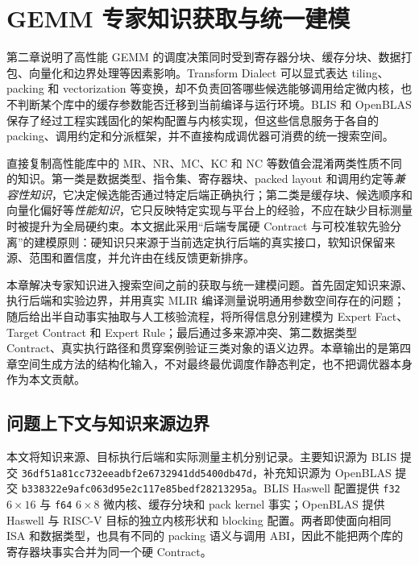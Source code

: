 
\chapter{GEMM 专家知识获取与统一建模}

第二章说明了高性能 GEMM 的调度决策同时受到寄存器分块、缓存分块、数据打包、向量化和边界处理等因素影响。Transform Dialect 可以显式表达 tiling、packing 和 vectorization 等变换，却不负责回答哪些候选能够调用给定微内核，也不判断某个库中的缓存参数能否迁移到当前编译与运行环境。BLIS 和 OpenBLAS 保存了经过工程实践固化的架构配置与内核实现，但这些信息服务于各自的 packing、调用约定和分派框架，并不直接构成调优器可消费的统一搜索空间\cite{VanZee2015BLIS,OpenMathLibOpenBLAS,LLVMProjectTransformDialect}。

直接复制高性能库中的 MR、NR、MC、KC 和 NC 等数值会混淆两类性质不同的知识。第一类是数据类型、指令集、寄存器块、packed layout 和调用约定等\emph{兼容性知识}，它决定候选能否通过特定后端正确执行；第二类是缓存块、候选顺序和向量化偏好等\emph{性能知识}，它只反映特定实现与平台上的经验，不应在缺少目标测量时被提升为全局硬约束。本文据此采用“后端专属硬 Contract 与可校准软先验分离”的建模原则：硬知识只来源于当前选定执行后端的真实接口，软知识保留来源、范围和置信度，并允许由在线反馈更新排序。

本章解决专家知识进入搜索空间之前的获取与统一建模问题。首先固定知识来源、执行后端和实验边界，并用真实 MLIR 编译测量说明通用参数空间存在的问题；随后给出半自动事实抽取与人工核验流程，将所得信息分别建模为 Expert Fact、Target Contract 和 Expert Rule；最后通过多来源冲突、第二数据类型 Contract、真实执行路径和贯穿案例验证三类对象的语义边界。本章输出的是第四章空间生成方法的结构化输入，不对最终最优调度作静态判定，也不把调优器本身作为本文贡献。

\section{问题上下文与知识来源边界}

本文将知识来源、目标执行后端和实际测量主机分别记录。主要知识源为 BLIS 提交 \texttt{36df51a81cc732eeadbf2e6732941dd5400db47d}，补充知识源为 OpenBLAS 提交 \texttt{b338322e9afc063d95e2c117e85bedf28213295a}。BLIS Haswell 配置提供 \texttt{f32} $6\times16$ 与 \texttt{f64} $6\times8$ 微内核、缓存分块和 pack kernel 事实；OpenBLAS 提供 Haswell 与 RISC-V 目标的独立内核形状和 blocking 配置。两者即使面向相同 ISA 和数据类型，也具有不同的 packing 语义与调用 ABI，因此不能把两个库的寄存器块事实合并为同一个硬 Contract。

